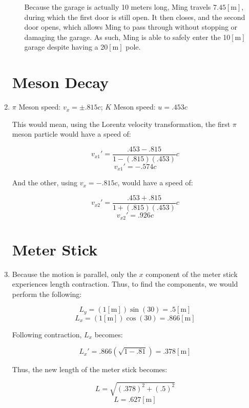 \begin{enumerate}
\begin{enumerate}
        Because the garage is actually 10 meters long, Ming travels $7.45[\si{\meter}]$, during which the first door is still open. It then closes, and the second door opens, which allows Ming to pass through without stopping or damaging the garage. As such, Ming is able to safely enter the 10$[\si{\meter}]$ garage despite having a 20$[\si{\meter}]$ pole.

    \end{enumerate}

    \section{Meson Decay}

  \item $\pi$ Meson speed: $v_x=\pm.815c$; $K$ Meson speed: $u=.453c$

    This would mean, using the Lorentz velocity transformation, the first $\pi$ meson particle would have a speed of:

    $$v_{x1}'=\frac{.453-.815}{1-(.815)(.453)}c$$
    $$\boxed{v_{x1}'=-.574c}$$

    And the other, using $v_x=-.815c$, would have a speed of:

    $$v_{x2}'=\frac{.453+.815}{1+(.815)(.453)}c$$
    $$\boxed{v_{x2}'=.926c}$$

    \section{Meter Stick}

  \item Because the motion is parallel, only the $x$ component of the meter stick experiences length contraction. Thus, to find the components, we would perform the following:

    $$L_y=(1[\si{\meter}])\sin(30)=.5[\si{\meter}]$$
    $$L_x=(1[\si{\meter}])\cos(30)=.866[\si{\meter}]$$

      Following contraction, $L_x$ becomes:

      $$L_x'=.866(\sqrt{1-.81})=.378[\si{\meter}]$$

      Thus, the new length of the meter stick becomes:

      $$L=\sqrt{(.378)^2+(.5)^2}$$
      $$\boxed{L=.627[\si{\meter}]}$$


\end{enumerate}



